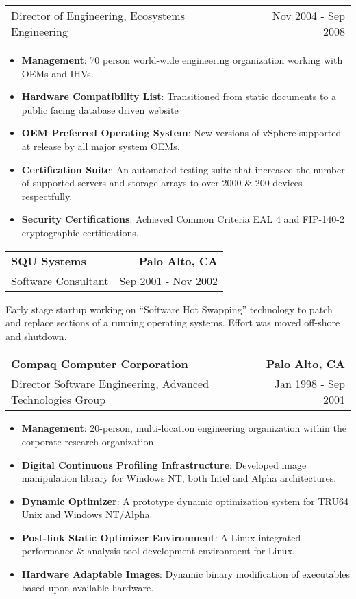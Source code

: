 \documentclass[letterpaper,11pt]{article}
\makeatletter
\newcommand{\resumeCompanyHeading}[4]{
  \vspace{-1pt}
    \item
    \begin{tabular*}{1.0\textwidth}[t]{l@{\extracolsep{\fill}}r}
      \textbf{#1} & \textbf{#2} \\
      {#3} & {#4}
    \end{tabular*}\vspace{-10pt}
  }
\newcommand{\resumeCompanyPositionHeading}[2]{
      \item
      \begin{tabular*}{1.0\textwidth}{l@{\extracolsep{\fill}}r}
        {#1} & {#2}
    \end{tabular*}\vspace{-10pt}
}
\newcommand{\resumeJobDescription}[1][]{
    \vspace{-1pt}\par{#1}
}
\newcommand{\resumeItem}[2]{\item{{\textbf{\small#1}}: {\small#2 \vspace{-1pt}}}}
\newcommand{\resumeItemListStart}{\begin{itemize}}
\newcommand{\resumeItemListEnd}{\end{itemize}}\vspace{-10pt}
\makeatother
\begin{document}
          \resumeCompanyPositionHeading 
          {Director of Engineering, Ecosystems Engineering}
          {Nov 2004 - Sep 2008}
            \resumeItemListStart
                \resumeItem{Management}{70 person world-wide engineering organization working with OEMs and IHVs.}
                \resumeItem{Hardware Compatibility List}{Transitioned from static documents to a public facing database driven website}
                \resumeItem{OEM Preferred Operating System}{New versions of vSphere supported at release by all major system OEMs.}
                \resumeItem{Certification Suite}{An automated testing suite that increased the number of supported servers and storage arrays
                             to over 2000 \& 200 devices respectfully.}
                \resumeItem{Security Certifications}{Achieved Common Criteria EAL 4 and FIP-140-2 cryptographic certifications.}
            \resumeItemListEnd
  
          \resumeCompanyHeading
            {SQU Systems}{Palo Alto, CA}
            {Software Consultant}{Sep 2001 - Nov 2002}
              \resumeJobDescription{
                Early stage startup working on “Software Hot Swapping” technology to patch and replace sections of a running operating
                systems.  Effort was moved off-shore and shutdown.}

          \resumeCompanyHeading
            {Compaq Computer Corporation}{Palo Alto, CA}
            {Director Software Engineering, Advanced Technologies Group}{Jan 1998 - Sep 2001}
            \resumeItemListStart
                \resumeItem{Management}{20-person, multi-location engineering organization within the corporate research organization}
                \resumeItem{Digital Continuous Profiling Infrastructure}{Developed image manipulation library for Windows NT, both Intel and Alpha architectures.}
                \resumeItem{Dynamic Optimizer}{A prototype dynamic optimization system for TRU64 Unix and Windows NT/Alpha.}
                \resumeItem{Post-link Static Optimizer Environment}{A Linux integrated performance \& analysis tool development environment for Linux.}
                \resumeItem{Hardware Adaptable Images}{Dynamic binary modification of executables based upon available hardware.}
            \resumeItemListEnd
\end{document}
